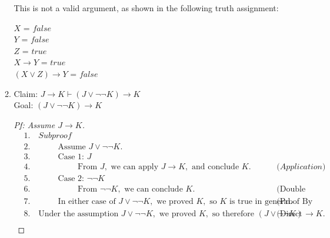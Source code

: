 \documentclass{article}
\begin{document}
\begin{enumerate}
\begin{enumerate}
        This is not a valid argument, as shown in the following truth assignment:
        
        $X$ = $false$ \\
        $Y$ = $false$ \\
        $Z$ = $true$ \\
        $X \rightarrow Y$ = $true$ \\
        $(X \lor Z) \rightarrow Y$ = $false$ \\

        \item
        Claim: $J \rightarrow K \vdash (J \lor \neg \neg K) \rightarrow K$ \\
        Goal: $(J \lor \neg \neg K) \rightarrow K$
        \begin{proof}[Pf: Assume $J \rightarrow K$]
            \begin{align*}
                &1. \quad Subproof \\
                &2. \quad \hspace{1cm} \text{Assume } J \lor \neg \neg K. \\
                &3. \quad \hspace{1cm} \text{Case 1: } J \\
                &4. \quad \hspace{2cm} \text{From } J, \text{ we can apply } J \rightarrow K, \text{ and conclude } K. && \text{($Application$)} \\
                &5. \quad \hspace{1cm} \text{Case 2: } \neg \neg K \\
                &6. \quad \hspace{2cm} \text{From } \neg \neg K, \text{ we can conclude } K. && \text{(Double Negation)} \\
                &7. \quad \hspace{1cm} \text{In either case of } J \lor \neg \neg K, \text{ we proved } K, \text{ so } K \text{ is true in general.} && \text{(Proof By Cases)} \\
                &8. \quad \text{Under the assumption } J \lor \neg \neg K, \text{ we proved } K, \text{ so therefore } (J \lor \neg \neg K) \rightarrow K. && \text{(Direct Proof)}\\
            \end{align*}
        \end{proof}
    \end{enumerate}
\end{enumerate}
\end{document}
